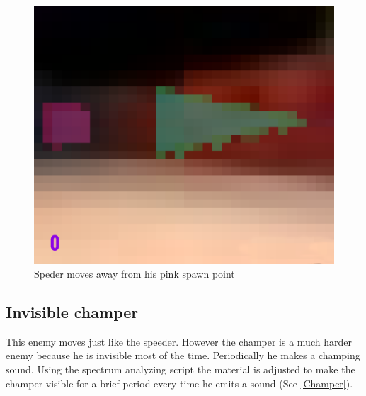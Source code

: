 \begin{figure}[h]
  \centering
  \includegraphics[width=1\textwidth, height=1\textwidth]{images/game_systems/SpeederSpawns.png}
  \caption{Speder moves away from his pink spawn point}
  \label{Speeder}
\end{figure}


\subsection{Invisible champer}\label{InvisibleChamper}
This enemy moves just like the speeder. However the champer is a much harder enemy because he is invisible most of the time. Periodically he makes a champing sound. Using the spectrum analyzing script the material is adjusted to make the champer visible for a brief period every time he emits a sound (See \cref{Champer}).


